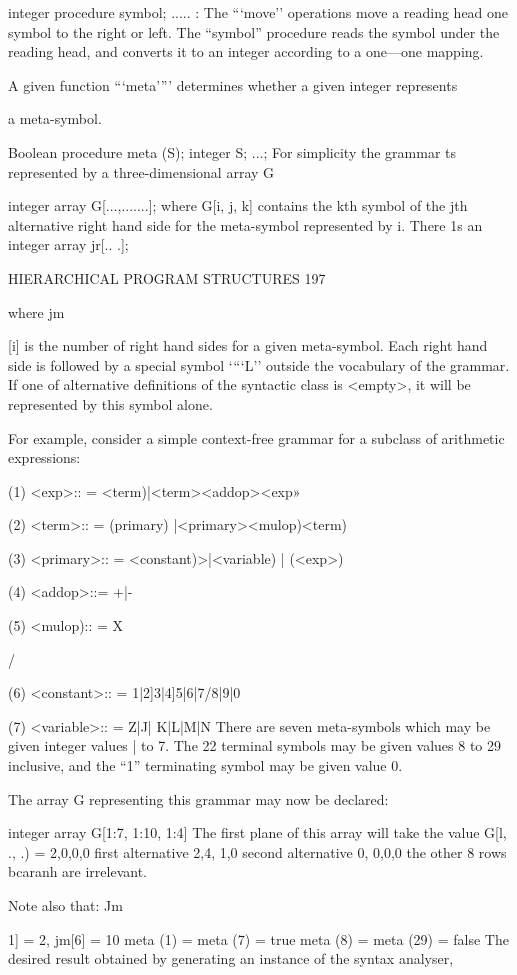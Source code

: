 {{integer procedure symbol; ..... : The “‘move’’ operations move a reading head one symbol to the right or left. The “symbol” procedure reads the symbol under the reading head, and converts it to an integer according to a one—one mapping.

A given function “‘meta’”’ determines whether a given integer represents

a meta-symbol.

Boolean procedure meta (S); integer S; ...; For simplicity the grammar ts represented by a three-dimensional array G

integer array G[...,.......]; where G[i, j, k] contains the kth symbol of the jth alternative right hand side for the meta-symbol represented by i. There 1s an integer array jr[.. .];

HIERARCHICAL PROGRAM STRUCTURES 197

where jm{[i] is the number of right hand sides for a given meta-symbol. Each right hand side is followed by a special symbol ‘“‘L’’ outside the vocabulary of the grammar. If one of alternative definitions of the syntactic class is <empty>, it will be represented by this symbol alone.

For example, consider a simple context-free grammar for a subclass of arithmetic expressions:

(1) <exp>:: = <term)|<term><addop><exp»

(2) <term>:: = (primary) |<primary><mulop)<term)

(3) <primary>:: = <constant)>|<variable) | (<exp>)

(4) <addop>::= +|-

(5) <mulop):: = X{/
	
	(6) <constant>:: = 1|2]3|4]5|6|7/8|9|0
	
	(7) <variable>:: = Z|J| K|L|M|N There are seven meta-symbols which may be given integer values | to 7. The 22 terminal symbols may be given values 8 to 29 inclusive, and the “1” terminating symbol may be given value 0.
	
	The array G representing this grammar may now be declared:
	
	integer array G[1:7, 1:10, 1:4] The first plane of this array will take the value G[l, ., .) = 2,0,0,0 first alternative 2,4, 1,0 second alternative 0, 0,0,0 the other 8 rows bcaranh are irrelevant.
	
	Note also that: Jm{1] = 2, jm[6] = 10 meta (1) = meta (7) = true meta (8) = meta (29) = false The desired result obtained by generating an instance of the syntax analyser,
		
}}}}}
